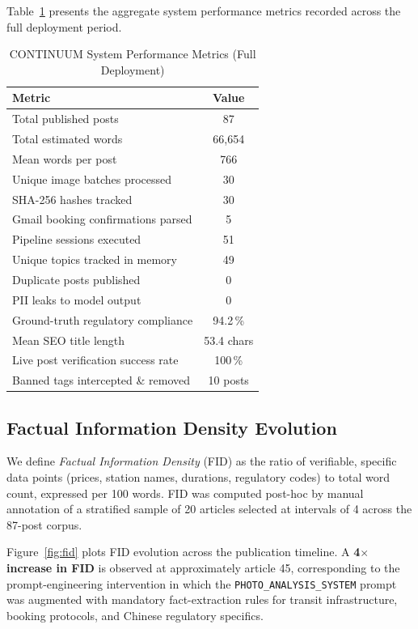 \documentclass[conference]{IEEEtran}
\begin{document}
Table~\ref{tab:metrics} presents the aggregate system performance metrics
recorded across the full deployment period.

\begin{table}[!t]
\caption{CONTINUUM System Performance Metrics (Full Deployment)}
\label{tab:metrics}
\centering
\begin{tabular}{lc}
\toprule
\textbf{Metric} & \textbf{Value} \\
\midrule
Total published posts & 87 \\
Total estimated words & 66{,}654 \\
Mean words per post & 766 \\
Unique image batches processed & 30 \\
SHA-256 hashes tracked & 30 \\
Gmail booking confirmations parsed & 5 \\
Pipeline sessions executed & 51 \\
Unique topics tracked in memory & 49 \\
Duplicate posts published & 0 \\
PII leaks to model output & 0 \\
Ground-truth regulatory compliance & 94.2\,\% \\
Mean SEO title length & 53.4 chars \\
Live post verification success rate & 100\,\% \\
Banned tags intercepted \& removed & 10 posts \\
\bottomrule
\end{tabular}
\end{table}

\subsection{Factual Information Density Evolution}

We define \emph{Factual Information Density} (FID) as the ratio of verifiable,
specific data points (prices, station names, durations, regulatory codes) to
total word count, expressed per 100 words. FID was computed post-hoc by
manual annotation of a stratified sample of 20 articles selected at
intervals of 4 across the 87-post corpus.

Figure~\ref{fig:fid} plots FID evolution across the publication timeline.
A \textbf{4$\times$ increase in FID} is observed at approximately article 45,
corresponding to the prompt-engineering intervention in which the
\texttt{PHOTO\_ANALYSIS\_SYSTEM} prompt was augmented with mandatory
fact-extraction rules for transit infrastructure, booking protocols, and
Chinese regulatory specifics.
\end{document}
